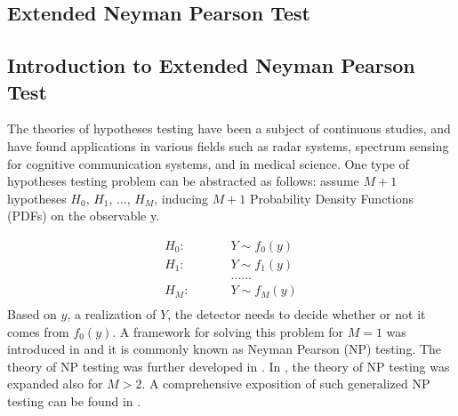 \documentclass[12pt,journal,a4paper,twoside,onecolumn,draft]{IEEEtran}
\begin{document}
\begin{spacing}{2.5}
\section{Extended Neyman Pearson Test}

\subsection{Introduction to Extended Neyman Pearson Test}
The theories of hypotheses testing have been a subject of continuous studies, and have found applications in various fields such as radar systems, spectrum sensing for cognitive communication systems, and in  medical science. One type of hypotheses testing problem can be abstracted as  follows: assume $M+1$  hypotheses $H_0$, $H_1$, ..., $H_{M}$, inducing $M+1$  Probability Density Functions (PDFs) on the observable y.

  \begin{equation}
\label{equ:hypothesis}
\begin{split}
H_0:\;\;\;\;\;\;\;\;\;&Y \sim f_0(y) \\
H_1:\;\;\;\;\;\;\;\;\;&Y \sim f_1(y)\\
&......\\
H_M:\;\;\;\;\;\;\;\;\;&Y \sim f_M(y)\\
\end{split}
\end{equation}
Based on $y$, a realization of $Y$, the detector needs to decide whether or not it comes from $f_0(y)$. A framework for solving this problem for $M=1$ was introduced in \cite{neyman1933problem} and it is commonly known as Neyman Pearson (NP) testing. The theory of NP testing was further developed in \cite{wald1939contributions}. In \cite{dantzig1951fundamental}, the theory of NP testing was  expanded also for $M>2$. A comprehensive exposition of such generalized NP testing can be found in \cite{LehmannTest}.


\end{spacing}
\end{document}
